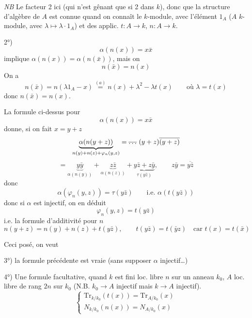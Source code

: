 \documentclass[11pt,a4paper]{article}
\begin{document}
\emph{NB} Le facteur 2 ici (qui n'est gênant que  si 2 \ill{} \ill{} dans $k$),  donc que la structure \ill{} d'algèbre de $A$ est connue quand on connaît le $k$-module, avec l'élément $1_A$ ($A$  $k$-module, avec $\lambda \mapsto \lambda \cdot 1_A$) et des  applic. $t : A \to k$, $n : A \to k$.


2°)
\[
  \alpha(n(x)) = x \bar{x}
\]
implique $\alpha(n(x)) = \alpha(n(\bar{x}))$, mais on \ill{} \ill{}  \struck{\ill{}} 
\[
  n(\bar{x}) = n(x)
\]
On a
\[
  n(\bar{x}) = n(\lambda 1_A - x) \overset{(a)}{=} n(x) + \lambda^2 - \lambda t(x) \qquad \text{où } \lambda = t(x)
\]
donc   $n(\bar{x}) = n(x)$.

La formule ci-dessus pour \struck{\ill{}}
\[
  \alpha(n(x)) = x \bar{x}
\]
donne, si on fait $x = y + z$
\[
  \underbrace{\alpha(n(y+z))}_{n(y) + n(z) + \varphi_n(y,z)}
  = \text{\struck{$\ldots$}}\ (y+z)\overline{(y+z)}
\]
\[
  = \underbrace{y\bar{y}}_{\alpha(n(y))} + \underbrace{z\bar{z}}_{\alpha(n(z))}
  + \underbrace{y\bar{z} + z\bar{y}}_{\tau(y\bar{z})} ,
  \qquad z\bar{y} = \overline{y\bar{z}}
\]
donc
\[
  \alpha(\varphi_n(y, z)) = \tau(y \bar{z}) \qquad \text{i.e. } \alpha(t(y\bar{z}))
\]
donc si $\alpha$ est injectif, on en déduit
\[
  \varphi_n(y, z) = t(y \bar{z})
\]
i.e. la formule d'additivité pour $n$
\[
  n(y + z) = n(y) + n(z) + t(y\bar{z}) , \qquad t(y\bar{z}) = t(\bar{y} z)
  \quad \text{car } t(x) = t(\bar{x})
\]

Ceci posé, on veut

3°) la formule précédente est vraie (sans supposer $\alpha$ injectif…)

4°) Une formule facultative, quand $k$ est fini loc. libre  \struck{\ill{}} $n$ sur un anneau $k_0$,  $A$ loc. libre de rang $2n$  sur $k_0$ (N.B. \struck{\ill{}} $k_0 \to A$ injectif mais $k \to A$ injectif).    
\[
  \begin{cases}
    \mathrm{Tr}_{k/k_0}(t(x)) = \mathrm{Tr}_{A/k_0}(x) \\
    N_{k/k_0}(n(x)) = N_{A/k_0}(x)
  \end{cases}
\]
\end{document}
